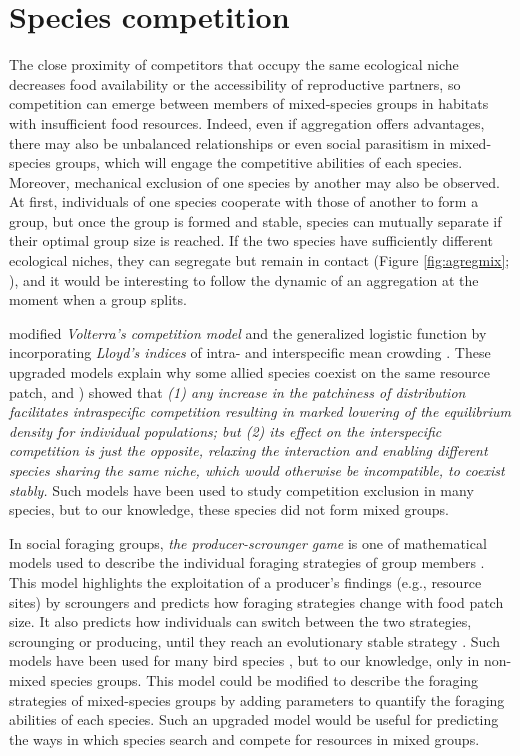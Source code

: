 	\section{Species competition}
The close proximity of competitors that occupy the same ecological niche decreases food availability or the accessibility of reproductive partners, so competition can emerge between members of mixed-species groups in habitats with insufficient food resources. Indeed, even if aggregation offers advantages, there may also be unbalanced relationships or even social parasitism in mixed-species groups, which will engage the competitive abilities of each species. Moreover, mechanical exclusion of one species by another may also be observed. At first, individuals of one species cooperate with those of another to form a group, but once the group is formed and stable, species can mutually separate if their optimal group size is reached. If the two species have sufficiently different ecological niches, they can segregate but remain in contact (Figure \ref{fig:agregmix}; \cite{villet_contemporary_2010}), and it would be interesting to follow the dynamic of an aggregation at the moment when a group splits.

\citet{kuno_aggregation_1988} modified \textit{Volterra’s competition model} \cite{volterra_fluctuations_1926} and the generalized logistic function by incorporating \textit{Lloyd’s indices} of intra- and interspecific mean crowding \cite{lloyd_`mean_1967}. These upgraded models explain why some allied species coexist on the same resource patch, and \citet{kuno_aggregation_1988}) showed that \textit{(1) any increase in the patchiness of distribution facilitates intraspecific competition resulting in marked lowering of the equilibrium density for individual populations; but (2) its effect on the interspecific competition is just the opposite, relaxing the interaction and enabling different species sharing the same niche, which would otherwise be incompatible, to coexist stably.} Such models have been used to study competition exclusion in many species, but to our knowledge, these species did not form mixed groups.

In social foraging groups, \textit{the producer-scrounger game} is one of mathematical models used to describe the individual foraging strategies of group members \cite{giraldeau_social_2000}. This model highlights the exploitation of a producer’s findings (e.g., resource sites) by scroungers and predicts how foraging strategies change with food patch size. It also predicts how individuals can switch between the two strategies, scrounging or producing, until they reach an evolutionary stable strategy \cite{giraldeau_food_1999}. Such models have been used for many bird species \citep{giraldeau_social_2000,sumpter_collective_2009}, but to our knowledge, only in non-mixed species groups. This model could be modified to describe the foraging strategies of mixed-species groups by adding parameters to quantify the foraging abilities of each species. Such an upgraded model would be useful for predicting the ways in which species search and compete for resources in mixed groups.


